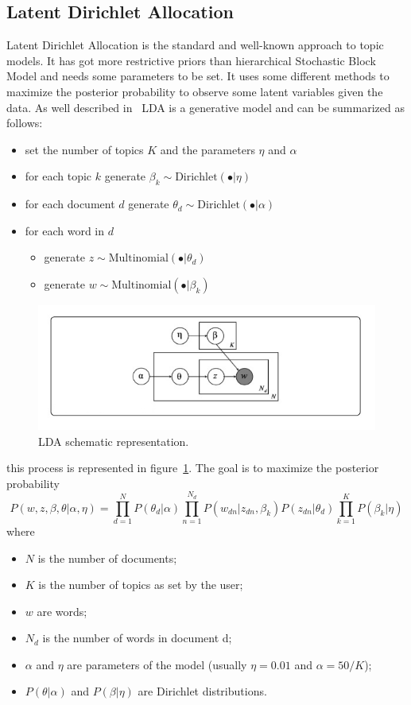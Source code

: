 \subsection{Latent Dirichlet Allocation}\label{sec:lda}
Latent Dirichlet Allocation is the standard and well-known approach to topic models. It has got more restrictive priors than hierarchical Stochastic Block Model and needs some parameters to be set. It uses some different methods to maximize the posterior probability to observe some latent variables given the data.
As well described in~\cite{Zhou2016} LDA is a generative model and can be summarized as follows:
\begin{itemize}
	\item set the number of topics $K$ and the parameters $\eta$ and $\alpha$
	\item for each topic $k$ generate $\beta_k\sim \text{Dirichlet}(\bullet |\eta)$
	\item for each document $d$ generate $\theta_d\sim \text{Dirichlet}(\bullet|\alpha)$
	\item for each word in $d$ 
	\begin{itemize}
		\item generate $z\sim \text{Multinomial}(\bullet|\theta_d)$
		\item generate $w\sim \text{Multinomial}(\bullet|\beta_k)$
	\end{itemize}
\end{itemize}
\begin{figure}[htb!]
	\centering
	\includegraphics[width=0.65\linewidth]{pictures/topic/LDA.jpeg}
	\caption{LDA schematic representation.}
	\label{fig:LDA}
\end{figure}
this process is represented in figure~\ref{fig:LDA}. The goal is to maximize the posterior probability
\begin{equation}\label{eq:lda}
P(w, z,\beta, \theta| \alpha, \eta)=\prod_{d=1}^N P(\theta_d | \alpha)\prod_{n=1}^{N_d} P(w_{dn}|z_{dn},\beta_k)P(z_{dn}|\theta_d)\prod_{k=1}^KP(\beta_k|\eta)
\end{equation}
where
\begin{itemize}
	\item $N$ is the number of documents;
	\item $K$ is the number of topics as set by the user;
	\item $w$ are words;
	\item $N_d$ is the number of words in document d;
	\item $\alpha$ and $\eta$ are parameters of the model (usually $\eta=0.01$ and $\alpha=50/K$);
	\item $P(\theta | \alpha)$ and $P(\beta|\eta)$ are Dirichlet distributions.
\end{itemize}
